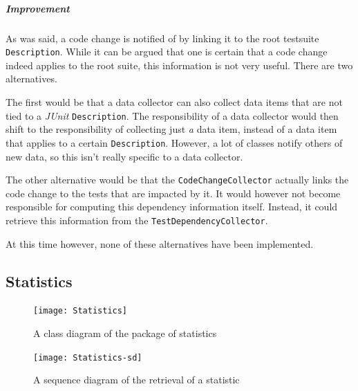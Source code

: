 \documentclass[i2]{oss}
\newcommand{\class}[1]{\texttt{#1}}
\newcommand{\junit}{\emph{JUnit }}
\begin{document}

\subparagraph{Improvement} 

As was said, a code change is notified of by linking it to the root testsuite \class{Description}.
While it can be argued that one is certain that a code change indeed applies to the root suite, this information is not very useful.
There are two alternatives.

The first would be that a data collector can also collect data items that are not tied to a \junit \class{Description}.
The responsibility of a data collector would then shift to the responsibility of collecting just \emph{a} data item, instead of a data item that applies to a certain \class{Description}.
However, a lot of classes notify others of new data, so this isn't really specific to a data collector.

The other alternative would be that the \class{CodeChangeCollector} actually links the code change to the tests that are impacted by it.
It would however not become responsible for computing this dependency information itself.
Instead, it could retrieve this information from the \class{TestDependencyCollector}.

At this time however, none of these alternatives have been implemented.



\subsection{Statistics}
\label{subssec: statistics}

\begin{figure}[tbp]
\begin{center}
    \texttt{[image: Statistics]}
    \caption{A class diagram of the package of statistics}
	\label{fig:statistics}
\end{center}
\end{figure}

\begin{figure}[tbp]
\begin{center}
    \texttt{[image: Statistics-sd]}
    \caption{A sequence diagram of the retrieval of a statistic}
	\label{fig:statistics-sd}
\end{center}
\end{figure}
\end{document}
